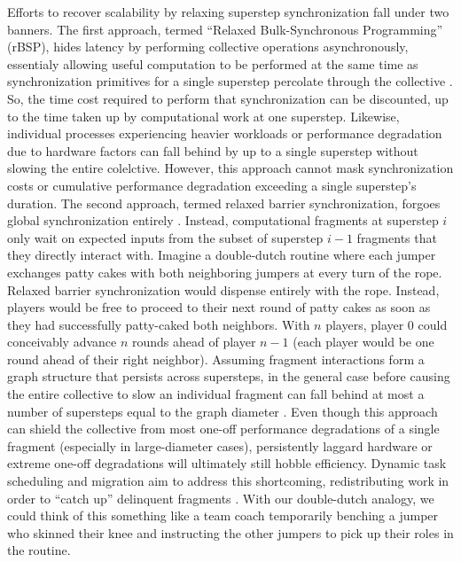 Efforts to recover scalability by relaxing superstep synchronization fall under two banners.
The first approach, termed ``Relaxed Bulk-Synchronous Programming'' (rBSP), hides latency by performing collective operations asynchronously, essentialy allowing useful computation to be performed at the same time as synchronization primitives for a single superstep percolate through the collective \citep{heroux2014toward}.
So, the time cost required to perform that synchronization can be discounted, up to the time taken up by computational work at one superstep.
Likewise, individual processes experiencing heavier workloads or performance degradation due to hardware factors can fall behind by up to a single superstep without slowing the entire colelctive.
However, this approach cannot mask synchronization costs or cumulative performance degradation exceeding a single superstep's duration.
The second approach, termed relaxed barrier synchronization, forgoes global synchronization entirely \citep{kim1998relaxed}.
Instead, computational fragments at superstep $i$ only wait on expected inputs from the subset of superstep $i-1$ fragments that they directly interact with.
Imagine a double-dutch routine where each jumper exchanges patty cakes with both neighboring jumpers at every turn of the rope.
Relaxed barrier synchronization would dispense entirely with the rope.
Instead, players would be free to proceed to their next round of patty cakes as soon as they had successfully patty-caked both neighbors.
With $n$ players, player 0 could conceivably advance $n$ rounds ahead of player $n-1$ (each player would be one round ahead of their right neighbor).
Assuming fragment interactions form a graph structure that persists across supersteps, in the general case before causing the entire collective to slow an individual fragment can fall behind at most a number of supersteps equal to the graph diameter \citep{gamell2015local}.
Even though this approach can shield the collective from most one-off performance degradations of a single fragment (especially in large-diameter cases), persistently laggard hardware or extreme one-off degradations will ultimately still hobble efficiency.
Dynamic task scheduling and migration aim to address this shortcoming, redistributing work in order to ``catch up'' delinquent fragments \citep{acun2014parallel}.
With our double-dutch analogy, we could think of this something like a team coach temporarily benching a jumper who skinned their knee and instructing the other jumpers to pick up their roles in the routine.

